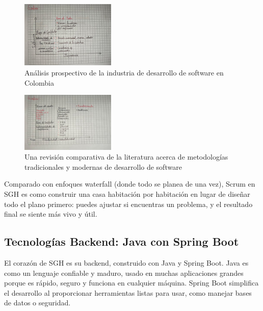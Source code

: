 \begin{figure}[h]
    \centering
    \includegraphics[width=0.4\textwidth]{graphics/analisis prospectivo de la industria de desarrollo de software en colombia.png}
    \caption{Análisis prospectivo de la industria de desarrollo de software en Colombia}
    \label{fig:analisis}
\end{figure}

\begin{figure}[h]
    \centering
    \includegraphics[width=0.4\textwidth]{graphics/una revision comparativa de la literatura acerca de metadologias tradicionales y modernas de desarrolladores de software.png}
    \caption{Una revisión comparativa de la literatura acerca de metodologías tradicionales y modernas de desarrollo de software}
    \label{fig:revision}
\end{figure}

Comparado con enfoques waterfall (donde todo se planea de una vez), Scrum en SGH es como construir una casa habitación por habitación en lugar de diseñar todo el plano primero: puedes ajustar si encuentras un problema, y el resultado final se siente más vivo y útil.



\subsection{Tecnologías Backend: Java con Spring Boot}
El corazón de SGH es su backend, construido con Java y Spring Boot. Java es como un lenguaje confiable y maduro, usado en muchas aplicaciones grandes porque es rápido, seguro y funciona en cualquier máquina. Spring Boot simplifica el desarrollo al proporcionar herramientas listas para usar, como manejar bases de datos o seguridad.

